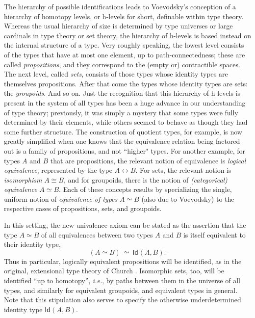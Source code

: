 \documentclass[11pt]{article}
\newcommand{\Id}{\mathsf{Id}}
\newcommand{\id}[1]{\Id_{#1}}
\theoremstyle{remark}
\theoremstyle{definition}
\begin{document}
The hierarchy of possible identifications leads to Voevodsky's conception of a hierarchy of homotopy levels, or h-levels for short, definable within type theory.  Whereas the usual hierarchy of size is determined by type universes or large
cardinals in type theory or set theory, the hierarchy of h-levels is based instead on the internal
structure of a type. 
Very roughly speaking, the lowest level consists of the types that have at most one element, up to path-connectedness; these are called \emph{propositions}, and they correspond to the (empty or) contractible spaces.  The next level, called \emph{sets}, consists of those types
whose identity types are themselves propositions. After that come the types whose identity types are sets: the \emph{groupoids}.
And so on.  Just the recognition that this hierarchy of h-levels is present in the system of all types has been a huge
advance in our understanding of type theory; previously, it was simply a mystery that some types were fully determined
by their elements, while others seemed to behave as though they had some further structure.  The construction of
quotient types, for example, is now greatly simplified when one knows that the equivalence relation being factored out
is a family of propositions, and not ``higher" types.  For another example, for types $A$ and $B$ that are propositions,
the relevant notion of equivalence is \emph{logical equivalence}, represented by the type $A\leftrightarrow B$.  For
sets, the relevant notion is \emph{isomorphism} $A\cong B$, and for groupoids, there is the notion of
\emph{(categorical) equivalence} $A\simeq B$.  Each of these concepts results by specializing the single, uniform notion
of \emph{equivalence of types} $A\simeq B$ (also due to Voevodsky) to the respective cases of propositions, sets, and groupoids.  

In this setting, the new univalence axiom can be stated as the assertion that the type $A\simeq B$ of all equivalences between
two types $A$ and $B$ is itself equivalent to their identity type,
\[\tag{UA}
(A\simeq B)\ \simeq\  \id{}(A,B).
\]
Thus in particular, logically equivalent propositions will be identified, as in the original, extensional type theory of
Church \cite{Church}.  Isomorphic sets, too, will be identified ``up to homotopy'', \textit{i.e.}, by paths between them in the
universe of all types, and similarly for equivalent groupoids, and equivalent types in general.  Note that this stipulation also serves to specify the otherwise underdetermined identity type $ \id{}(A,B)$.
\end{document}

